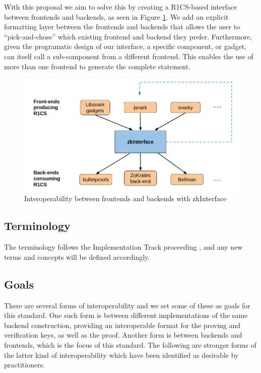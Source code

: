 \documentclass[a4paper,12pt]{article}
\newcommand{\dnote}[1]{\dtcolornote[Daniel]{red}{#1}}
\begin{document}
With this proposal we aim to solve this by creating a R1CS-based interface between frontends and backends, as seen in Figure \ref{interface}. We add an explicit formatting layer between the frontends and backends that allows the user to ``pick-and-chose'' which existing frontend and backend they prefer. Furthermore, given the programatic design of our interface, a specific component, or gadget, can itself call a sub-component from a different frontend. This enables the use of more than one frontend to generate the complete statement.

\begin{figure}[h!]
	\includegraphics[width=\linewidth]{interop.png}
	\caption{Interoperability between frontends and backends with zkInterface}
	\label{interface}
\end{figure}

\subsection{Terminology}
The terminology follows the Implementation Track proceeding \dnote{add reference}, and any new terms and concepts will be defined accordingly.

\subsection{Goals} 
\label{goals}

There are several forms of interoperability and we set some of these as goals for this standard. One such form is between different implementations of the same backend construction, providing an interoperable format for the proving and verification keys, as well as the proof. Another form is between backends and frontends, which is the focus of this standard. The following are stronger forms of the latter kind of interoperability which have been identified as desirable by practitioners.
\end{document}
